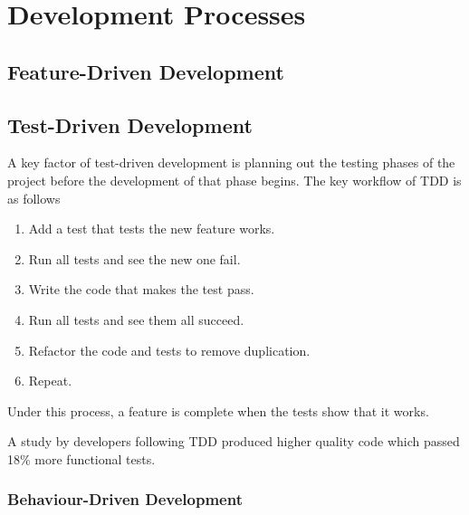 \section{Development Processes}

\subsection{Feature-Driven Development}

\subsection{Test-Driven Development}
A key factor of test-driven development is planning out the testing phases of the project before the development of that phase begins.
The key workflow of TDD is as follows \citep{Beck:2002:TDD:579193}
\begin{enumerate}
	\item Add a test that tests the new feature works.
	\item Run all tests and see the new one fail.
	\item Write the code that makes the test pass.
	\item Run all tests and see them all succeed.
	\item Refactor the code and tests to remove duplication.
	\item Repeat.
\end{enumerate}

Under this process, a feature is complete when the tests show that it works.

A study by \cite{George:2003:IIT:952532.952753} developers following TDD produced higher quality code which passed 18\% more functional tests.

\subsubsection{Behaviour-Driven Development}


